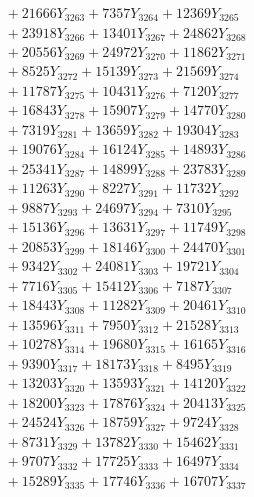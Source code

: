 \documentclass[a4paper,10pt]{article}
\begin{document}
{\begin{align}
&\;  + 21666 Y_{3263} + 7357 Y_{3264} + 12369 Y_{3265} \\[0.3ex]
&\;  + 23918 Y_{3266} + 13401 Y_{3267} + 24862 Y_{3268} \\[0.5ex]\allowbreak
&\;  + 20556 Y_{3269} + 24972 Y_{3270} + 11862 Y_{3271} \\[0.3ex]
&\;  + 8525 Y_{3272} + 15139 Y_{3273} + 21569 Y_{3274} \\[0.3ex]
&\;  + 11787 Y_{3275} + 10431 Y_{3276} + 7120 Y_{3277} \\[0.3ex]
&\;  + 16843 Y_{3278} + 15907 Y_{3279} + 14770 Y_{3280} \\[0.3ex]
&\;  + 7319 Y_{3281} + 13659 Y_{3282} + 19304 Y_{3283} \\[0.3ex]
&\;  + 19076 Y_{3284} + 16124 Y_{3285} + 14893 Y_{3286} \\[0.3ex]
&\;  + 25341 Y_{3287} + 14899 Y_{3288} + 23783 Y_{3289} \\[0.3ex]
&\;  + 11263 Y_{3290} + 8227 Y_{3291} + 11732 Y_{3292} \\[0.3ex]
&\;  + 9887 Y_{3293} + 24697 Y_{3294} + 7310 Y_{3295} \\[0.3ex]
&\;  + 15136 Y_{3296} + 13631 Y_{3297} + 11749 Y_{3298} \\[0.5ex]\allowbreak
&\;  + 20853 Y_{3299} + 18146 Y_{3300} + 24470 Y_{3301} \\[0.3ex]
&\;  + 9342 Y_{3302} + 24081 Y_{3303} + 19721 Y_{3304} \\[0.3ex]
&\;  + 7716 Y_{3305} + 15412 Y_{3306} + 7187 Y_{3307} \\[0.3ex]
&\;  + 18443 Y_{3308} + 11282 Y_{3309} + 20461 Y_{3310} \\[0.3ex]
&\;  + 13596 Y_{3311} + 7950 Y_{3312} + 21528 Y_{3313} \\[0.3ex]
&\;  + 10278 Y_{3314} + 19680 Y_{3315} + 16165 Y_{3316} \\[0.3ex]
&\;  + 9390 Y_{3317} + 18173 Y_{3318} + 8495 Y_{3319} \\[0.3ex]
&\;  + 13203 Y_{3320} + 13593 Y_{3321} + 14120 Y_{3322} \\[0.3ex]
&\;  + 18200 Y_{3323} + 17876 Y_{3324} + 20413 Y_{3325} \\[0.3ex]
&\;  + 24524 Y_{3326} + 18759 Y_{3327} + 9724 Y_{3328} \\[0.5ex]\allowbreak
&\;  + 8731 Y_{3329} + 13782 Y_{3330} + 15462 Y_{3331} \\[0.3ex]
&\;  + 9707 Y_{3332} + 17725 Y_{3333} + 16497 Y_{3334} \\[0.3ex]
&\;  + 15289 Y_{3335} + 17746 Y_{3336} + 16707 Y_{3337} \\[0.3ex]

\end{align}}
\end{document}
